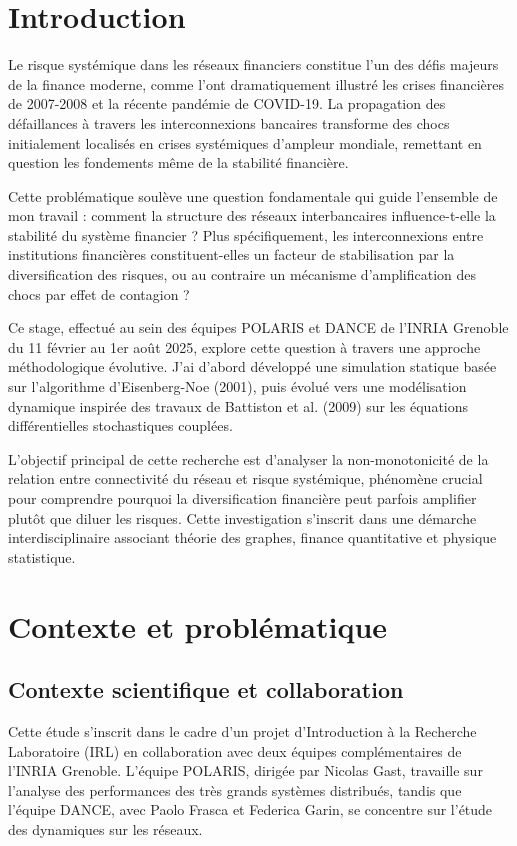 \documentclass[12pt,a4paper,twoside]{article}
\begin{document}
\section{Introduction}

Le risque systémique dans les réseaux financiers constitue l'un des défis majeurs de la finance moderne, comme l'ont dramatiquement illustré les crises financières de 2007-2008 et la récente pandémie de COVID-19. La propagation des défaillances à travers les interconnexions bancaires transforme des chocs initialement localisés en crises systémiques d'ampleur mondiale, remettant en question les fondements même de la stabilité financière.

Cette problématique soulève une question fondamentale qui guide l'ensemble de mon travail : comment la structure des réseaux interbancaires influence-t-elle la stabilité du système financier ? Plus spécifiquement, les interconnexions entre institutions financières constituent-elles un facteur de stabilisation par la diversification des risques, ou au contraire un mécanisme d'amplification des chocs par effet de contagion ?

Ce stage, effectué au sein des équipes POLARIS et DANCE de l'INRIA Grenoble du 11 février au 1er août 2025, explore cette question à travers une approche méthodologique évolutive. J'ai d'abord développé une simulation statique basée sur l'algorithme d'Eisenberg-Noe (2001), puis évolué vers une modélisation dynamique inspirée des travaux de Battiston et al. (2009) sur les équations différentielles stochastiques couplées.

L'objectif principal de cette recherche est d'analyser la non-monotonicité de la relation entre connectivité du réseau et risque systémique, phénomène crucial pour comprendre pourquoi la diversification financière peut parfois amplifier plutôt que diluer les risques. Cette investigation s'inscrit dans une démarche interdisciplinaire associant théorie des graphes, finance quantitative et physique statistique.

\section{Contexte et problématique}

\subsection{Contexte scientifique et collaboration}

Cette étude s'inscrit dans le cadre d'un projet d'Introduction à la Recherche Laboratoire (IRL) en collaboration avec deux équipes complémentaires de l'INRIA Grenoble. L'équipe POLARIS, dirigée par Nicolas Gast, travaille sur l'analyse des performances des très grands systèmes distribués, tandis que l'équipe DANCE, avec Paolo Frasca et Federica Garin, se concentre sur l'étude des dynamiques sur les réseaux.
\end{document}
